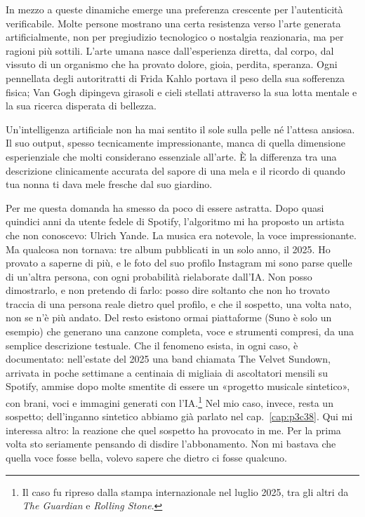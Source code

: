 In mezzo a queste dinamiche emerge una preferenza crescente per l'autenticità verificabile. Molte persone mostrano una certa resistenza verso l'arte generata artificialmente, non per pregiudizio tecnologico o nostalgia reazionaria, ma per ragioni più sottili. L'arte umana nasce dall'esperienza diretta, dal corpo, dal vissuto di un organismo che ha provato dolore, gioia, perdita, speranza. Ogni pennellata degli autoritratti di Frida Kahlo portava il peso della sua sofferenza fisica; Van Gogh dipingeva girasoli e cieli stellati attraverso la sua lotta mentale e la sua ricerca disperata di bellezza.

Un'intelligenza artificiale non ha mai sentito il sole sulla pelle né l'attesa ansiosa. Il suo output, spesso tecnicamente impressionante, manca di quella dimensione esperienziale che molti considerano essenziale all'arte. È la differenza tra una descrizione clinicamente accurata del sapore di una mela e il ricordo di quando tua nonna ti dava mele fresche dal suo giardino.

Per me questa domanda ha smesso da poco di essere astratta. Dopo quasi quindici anni da utente fedele di Spotify, l'algoritmo mi ha proposto un artista che non conoscevo: Ulrich Yande. La musica era notevole, la voce impressionante. Ma qualcosa non tornava: tre album pubblicati in un solo anno, il 2025. Ho provato a saperne di più, e le foto del suo profilo Instagram mi sono parse quelle di un'altra persona, con ogni probabilità rielaborate dall'IA. Non posso dimostrarlo, e non pretendo di farlo: posso dire soltanto che non ho trovato traccia di una persona reale dietro quel profilo, e che il sospetto, una volta nato, non se n'è più andato. Del resto esistono ormai piattaforme (Suno è solo un esempio) che generano una canzone completa, voce e strumenti compresi, da una semplice descrizione testuale. Che il fenomeno esista, in ogni caso, è documentato: nell'estate del 2025 una band chiamata The Velvet Sundown, arrivata in poche settimane a centinaia di migliaia di ascoltatori mensili su Spotify, ammise dopo molte smentite di essere un «progetto musicale sintetico», con brani, voci e immagini generati con l'IA.\footnote{Il caso fu ripreso dalla stampa internazionale nel luglio 2025, tra gli altri da \textit{The Guardian} e \textit{Rolling Stone}.} Nel mio caso, invece, resta un sospetto; dell'inganno sintetico abbiamo già parlato nel cap.~\ref{cap:p3c38}. Qui mi interessa altro: la reazione che quel sospetto ha provocato in me. Per la prima volta sto seriamente pensando di disdire l'abbonamento. Non mi bastava che quella voce fosse bella, volevo sapere che dietro ci fosse qualcuno.


